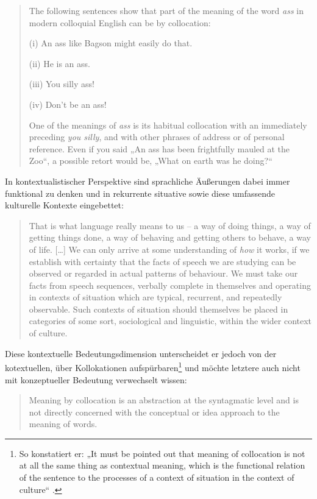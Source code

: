 \begin{quote}
The following sentences show that part of the meaning of the word \emph{ass} in modern colloquial English can be by collocation:

(i) An ass like Bagson might easily do that.

(ii) He is an ass.

(iii) You silly ass!

(iv) Don't be an ass!

One of the meanings of \emph{ass} is its habitual collocation with an immediately preceding \emph{you silly}, and with other phrases of address or of personal reference. Even if you said „An ass has been frightfully mauled at the Zoo``, a possible retort would be, „What on earth was he doing?{}`` \autocite[194-195]{firthPapersLinguistics193419511957}
\end{quote}

In kontextualistischer Perspektive sind sprachliche Äußerungen dabei immer funktional zu denken und in rekurrente situative sowie diese umfassende kulturelle Kontexte eingebettet:

\begin{quote}
That is what language really means to us -- a way of doing things, a way of getting things done, a way of behaving and getting others to behave, a way of life. {[}\ldots{]} We can only arrive at some understanding of \emph{how} it works, if we establish with certainty that the facts of speech we are studying can be observed or regarded in actual patterns of behaviour. We must take our facts from speech sequences, verbally complete in themselves and operating in contexts of situation which are typical, recurrent, and repeatedly observable. Such contexts of situation should themselves be placed in categories of some sort, sociological and linguistic, within the wider context of culture. \autocite[35]{firthSynopsisLinguisticTheory1957}
\end{quote}

Diese kontextuelle Bedeutungsdimension unterscheidet er jedoch von der kotextuellen, über Kollokationen aufspürbaren\footnote{So konstatiert er: „It must be pointed out that meaning of collocation is not at all the same thing as contextual meaning, which is the functional relation of the sentence to the processes of a context of situation in the context of culture`` \autocite[195]{firthPapersLinguistics193419511957}.} und möchte letztere auch nicht mit konzeptueller Bedeutung verwechselt wissen:

\begin{quote}
Meaning by collocation is an abstraction at the syntagmatic level and is not directly concerned with the conceptual or idea approach to the meaning of words. \autocite[196]{firthPapersLinguistics193419511957}
\end{quote}

